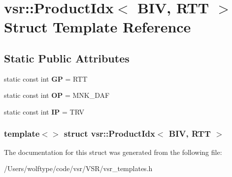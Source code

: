 \hypertarget{structvsr_1_1_product_idx_3_01_b_i_v_00_01_r_t_t_01_4}{\section{vsr\-:\-:Product\-Idx$<$ B\-I\-V, R\-T\-T $>$ Struct Template Reference}
\label{structvsr_1_1_product_idx_3_01_b_i_v_00_01_r_t_t_01_4}
}
\subsection*{Static Public Attributes}
\begin{DoxyCompactItemize}
\item 
\hypertarget{structvsr_1_1_product_idx_3_01_b_i_v_00_01_r_t_t_01_4_af849091163af2d1815dddcb3636982f7}{static const int {\bfseries G\-P} = R\-T\-T}\label{structvsr_1_1_product_idx_3_01_b_i_v_00_01_r_t_t_01_4_af849091163af2d1815dddcb3636982f7}

\item 
\hypertarget{structvsr_1_1_product_idx_3_01_b_i_v_00_01_r_t_t_01_4_a5557171988cb388ee60abed2155ee5b9}{static const int {\bfseries O\-P} = M\-N\-K\-\_\-\-D\-A\-F}\label{structvsr_1_1_product_idx_3_01_b_i_v_00_01_r_t_t_01_4_a5557171988cb388ee60abed2155ee5b9}

\item 
\hypertarget{structvsr_1_1_product_idx_3_01_b_i_v_00_01_r_t_t_01_4_aec743451af7b9ec0a02f18570b348e61}{static const int {\bfseries I\-P} = T\-R\-V}\label{structvsr_1_1_product_idx_3_01_b_i_v_00_01_r_t_t_01_4_aec743451af7b9ec0a02f18570b348e61}

\end{DoxyCompactItemize}
\subsubsection*{template$<$$>$ struct vsr\-::\-Product\-Idx$<$ B\-I\-V, R\-T\-T $>$}



The documentation for this struct was generated from the following file\-:\begin{DoxyCompactItemize}
\item 
/\-Users/wolftype/code/vsr/\-V\-S\-R/vsr\-\_\-templates.\-h\end{DoxyCompactItemize}
